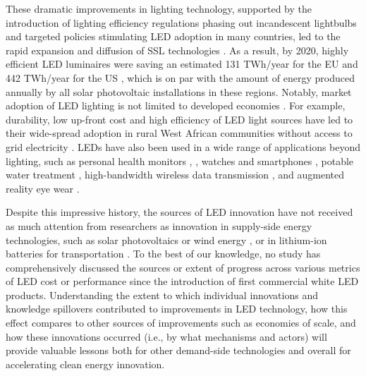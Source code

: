 \documentclass[twoside,twocolumn,9pt]{article}
\begin{document}
These dramatic improvements in lighting technology, supported by the introduction of lighting efficiency regulations phasing out incandescent lightbulbs and targeted policies stimulating LED adoption in many countries, led to the rapid expansion and diffusion of SSL technologies \cite{weinold2020long}\cite{Mills2014}\cite{stegmaier2021incandescent}\cite{grubb2021new}. As a result, by 2020, highly efficient LED luminaires were saving an estimated 131 TWh/year for the EU \cite{eu2019impactass} and 442 TWh/year for the US \cite{guidehouse2020adoption}, which is on par with the amount of energy produced annually by all solar photovoltaic installations in these regions. Notably, market adoption of LED lighting is not limited to developed economies \cite{Kamat2020}. For example, durability, low up-front cost and high efficiency of LED light sources have led to their wide-spread adoption in rural West African communities without access to grid electricity \cite{Bensch2017}. LEDs have also been used in a wide range of applications beyond lighting, such as personal health monitors \cite{o2019optical}, \cite{Wyatt2020}, watches and smartphones \cite{Bai2017}, potable water treatment \cite{Lui2014}, high-bandwidth wireless data transmission \cite{Haas2016}, and augmented reality eye wear \cite{Lee2016}. 

Despite this impressive history, the sources of LED innovation have not received as much attention from researchers as innovation in supply-side energy technologies, such as solar photovoltaics \cite{kavlak2018evaluating} or wind energy \cite{qiu2012price}\cite{jennings2020policy}, or in lithium-ion batteries for transportation \cite{Ziegler2021}\cite{Stephan2021}. To the best of our knowledge, no study has comprehensively discussed the sources or extent of progress across various metrics of LED cost or performance since the introduction of first commercial white LED products. Understanding the extent to which individual innovations and knowledge spillovers contributed to improvements in LED technology, how this effect compares to other sources of improvements such as economies of scale, and how these innovations occurred (i.e., by what mechanisms and actors) will provide valuable lessons both for other demand-side technologies and overall for accelerating clean energy innovation.
\end{document}
